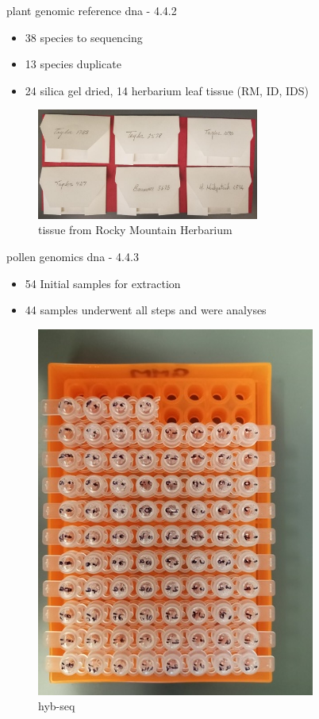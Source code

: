 \documentclass[
  ignorenonframetext,
]{beamer}
\providecommand{\tightlist}{%
  \setlength{\itemsep}{0pt}\setlength{\parskip}{0pt}}
\begin{document}
\begin{frame}{plant genomic reference dna - 4.4.2}
\protect\hypertarget{plant-genomic-reference-dna---4.4.2}{}
\begin{itemize}
\tightlist
\item
  38 species to sequencing
\item
  13 species duplicate
\item
  24 silica gel dried, 14 herbarium leaf tissue (RM, ID, IDS)
\end{itemize}

\begin{figure}
\centering
\includegraphics[width=0.65\textwidth,height=\textheight]{../graphics/pictures/Bernie_Tissue.jpg}
\caption{tissue from Rocky Mountain Herbarium}
\end{figure}
\end{frame}

\begin{frame}{pollen genomics dna - 4.4.3}
\protect\hypertarget{pollen-genomics-dna---4.4.3}{}
\begin{itemize}
\tightlist
\item
  54 Initial samples for extraction\\
\item
  44 samples underwent all steps and were analyses
\end{itemize}

\begin{figure}
\centering
\includegraphics{../graphics/pictures/hyb-seq.resized.jpg}
\caption{hyb-seq}
\end{figure}

\note{}
\end{frame}
\end{document}
